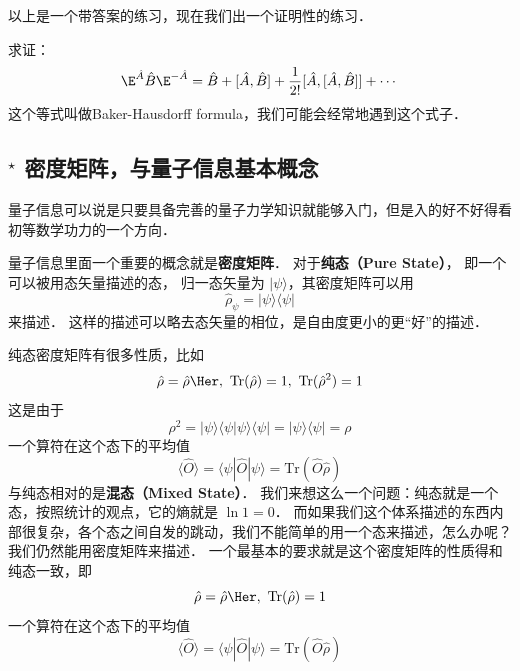 以上是一个带答案的练习，现在我们出一个证明性的练习．

\begin{exercise}{}
求证：
\begin{equation}
\E^{\hat A}\hat B \E^{-\hat A} = \hat{B} + [\hat A,\hat B] + \frac{1}{2!} [\hat A, [\hat A,\hat B]] + \cdots
\end{equation}
这个等式叫做Baker-Hausdorff formula，我们可能会经常地遇到这个式子．
\end{exercise}

\subsection{$^\star$ 密度矩阵，与量子信息基本概念}

量子信息可以说是只要具备完善的量子力学知识就能够入门，但是入的好不好得看初等数学功力的一个方向．

量子信息里面一个重要的概念就是\textbf{密度矩阵}． 对于\textbf{纯态（Pure State）}， 即一个可以被用态矢量描述的态， 归一态矢量为 $|\psi\rangle$，其密度矩阵可以用
\begin{equation}
\hat\rho_{\psi} = |\psi\rangle\langle\psi|
\end{equation}
来描述． 这样的描述可以略去态矢量的相位，是自由度更小的更“好”的描述．

纯态密度矩阵有很多性质，比如
\begin{equation}
\hat\rho = \hat\rho\Her,\ \text{Tr}(\hat\rho) = 1,\ \text{Tr}(\hat\rho^2) = 1
\end{equation}
这是由于
\begin{equation}
\rho^2 = |\psi\rangle\langle\psi|\psi\rangle\langle\psi| = |\psi\rangle\langle\psi| = \rho
\end{equation}
一个算符在这个态下的平均值
\begin{equation}
\langle\hat O\rangle = \langle\psi|\hat O|\psi\rangle = \text{Tr}(\hat O\hat \rho)
\end{equation}
与纯态相对的是\textbf{混态（Mixed State）}． 我们来想这么一个问题：纯态就是一个态，按照统计的观点，它的熵就是 $\ln 1 = 0$． 而如果我们这个体系描述的东西内部很复杂，各个态之间自发的跳动，我们不能简单的用一个态来描述，怎么办呢？我们仍然能用密度矩阵来描述． 一个最基本的要求就是这个密度矩阵的性质得和纯态一致，即
\begin{equation}
\hat\rho = \hat\rho\Her,\ \text{Tr}(\hat\rho) = 1
\end{equation}
一个算符在这个态下的平均值
\begin{equation}
\langle\hat O\rangle = \langle\psi|\hat O|\psi\rangle = \text{Tr}(\hat O\hat \rho)
\end{equation}

